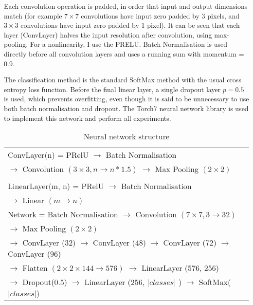 Each convolution operation is padded, in order that input and output dimensions match (for example $ 7\times7 $ convolutions have input zero padded by 3 pixels, and $3\times3$ convolutions have input zero padded by 1 pixel). It can be seen that each layer (ConvLayer) halves the input resolution after convolution, using max-pooling. For a nonlinearity, I use the \gls{PRELU}. Batch Normalisation is used directly before all convolution layers and uses a running sum with momentum = 0.9.

The classification method is the standard SoftMax method with the usual cross entropy loss function. Before the final linear layer, a single dropout layer $ p = 0.5 $ is used, which prevents overfitting, even though it is said to be unnecessary to use both batch normalisation and dropout.  The Torch7 \cite{Collobert2011a} neural network library is used to implement this network and perform all experiments. 

\begin{table}[h]
  \centering
    \caption{Neural network structure }
\begin{tabular}{ l } 

\toprule

 ConvLayer(n) = PRelU $\rightarrow$ Batch Normalisation \\ 
 $\rightarrow$  Convolution $(3\times3, n \rightarrow n * 1.5)$ $\rightarrow$  Max Pooling $(2\times2)$ \\
\\
 LinearLayer(m, n)  = PRelU $\rightarrow$ Batch Normalisation \\  $\rightarrow$  Linear $(m \rightarrow n)$ \\
\toprule
  Network = Batch Normalisation $\rightarrow$
 Convolution $(7\times7, 3 \rightarrow 32)$ \\
 $\rightarrow$ Max Pooling $(2\times2)$   \\

  $\rightarrow$ ConvLayer (32) $\rightarrow$  ConvLayer (48) $\rightarrow$ ConvLayer (72) $\rightarrow$ ConvLayer (96)   \\
  
  
  $\rightarrow$ Flatten $(2\times2\times144 \rightarrow 576)$ $\rightarrow$ LinearLayer (576, 256) \\
  
  $\rightarrow$ Dropout(0.5) $\rightarrow$ LinearLayer (256, $\vert classes \vert$ )  $\rightarrow$  SoftMax($\vert classes \vert$) \\
  
    
       
\toprule
\end{tabular}

\label{fig:focus_network}
\end{table}




